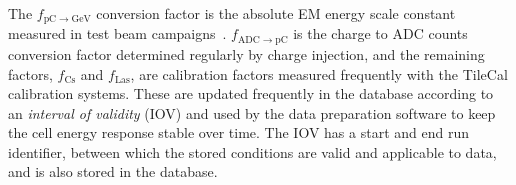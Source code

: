 The $f_{\mathrm{pC}\to \mathrm{GeV}}$ conversion factor is the absolute EM energy scale constant measured in test beam campaigns~\cite{testBeam}. $f_{\mathrm{ADC}\to \mathrm{pC}}$ is the charge to ADC counts conversion factor determined regularly by charge injection, and the remaining factors, $f_{\mathrm {Cs}}$ and $f_{\mathrm{Las}}$, are calibration factors measured frequently with the TileCal calibration systems. These are updated frequently in the database according to an \textit{interval of validity} (IOV) and used by the data preparation software to keep the cell energy response stable over time. The IOV has a start and end run identifier, between which the stored conditions are valid and applicable to data, and is also stored in the database. 
